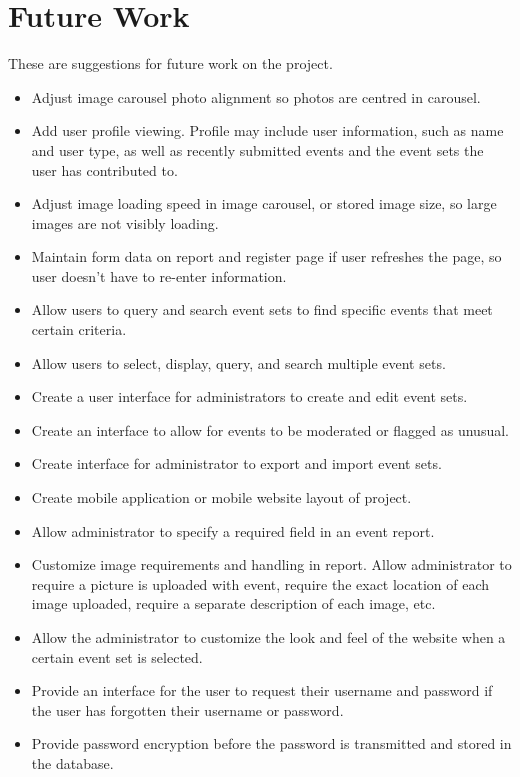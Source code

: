 

\chapter{Future Work}
These are suggestions for future work on the project.
\begin{itemize}
\item Adjust image carousel photo alignment so photos are centred in carousel.
\item Add user profile viewing. Profile may include user information, such as name and user type, as well as recently submitted events and the event sets the user has contributed to.
\item Adjust image loading speed in image carousel, or stored image size, so large images are not visibly loading.
\item Maintain form data on report and register page if user refreshes the page, so user doesn't have to re-enter information.
\item Allow users to query and search event sets to find specific events that meet certain criteria.
\item Allow users to select, display, query, and search multiple event sets.
\item Create a user interface for administrators to create and edit event sets.
\item Create an interface to allow for events to be moderated or flagged as unusual.
\item Create interface for administrator to export and import event sets.
\item Create mobile application or mobile website layout of project.
\item Allow administrator to specify a required field in an event report.
\item Customize image requirements and handling in report. Allow administrator to require a picture is uploaded with event, require the exact location of each image uploaded, require a separate description of each image, etc.
\item Allow the administrator to customize the look and feel of the website when a certain event set is selected.
\item Provide an interface for the user to request their username and password if the user has forgotten their username or password.
\item Provide password encryption before the password is transmitted and stored in the database.

\end{itemize}
